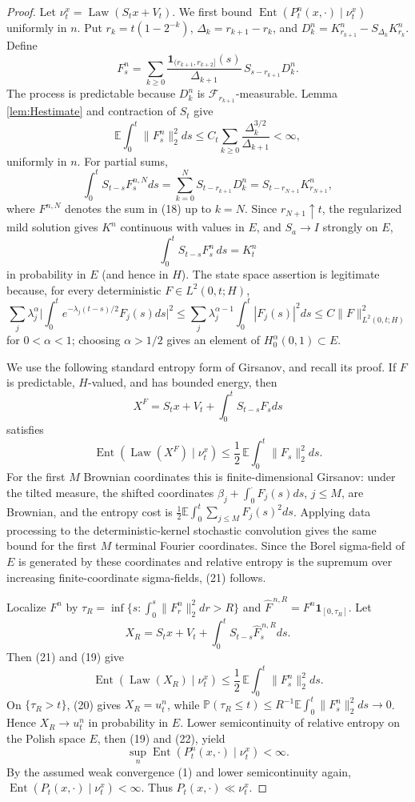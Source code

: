 \documentclass[12pt]{article}
\newcommand{\E}{\mathbb E}
\newcommand{\1}{\mathbf 1}
\newcommand{\Law}{\operatorname{Law}}
\newcommand{\calF}{\mathcal F}
\newcommand{\Ent}{\operatorname{Ent}}
\begin{document}
\begin{proof}
Let \(\nu_t^x=\Law(S_tx+V_t)\).  We first bound
\(\Ent(P_t^n(x,\cdot)\mid\nu_t^x)\) uniformly in \(n\).  Put
\(r_k=t(1-2^{-k})\), \(\Delta_k=r_{k+1}-r_k\), and
\(D_k^n=K^n_{r_{k+1}}-S_{\Delta_k}K^n_{r_k}\).  Define
\[
 F_s^n=\sum_{k\ge0}\frac{\1_{(r_{k+1},r_{k+2}]}(s)}{\Delta_{k+1}}\,
        S_{s-r_{k+1}}D_k^n .                                \tag{18}
\]
The process is predictable because \(D_k^n\) is \(\calF_{r_{k+1}}\)-measurable.
Lemma \ref{lem:Hestimate} and contraction of \(S_t\) give
\[
 \E\int_0^t\|F_s^n\|_2^2ds
 \le C_t\sum_{k\ge0}\frac{\Delta_k^{3/2}}{\Delta_{k+1}}<\infty, \tag{19}
\]
uniformly in \(n\).  For partial sums,
\[
 \int_0^tS_{t-s}F_s^{n,N}ds
 =\sum_{k=0}^NS_{t-r_{k+1}}D_k^n
 =S_{t-r_{N+1}}K^n_{r_{N+1}},
\]
where \(F^{n,N}\) denotes the sum in (18) up to \(k=N\).  Since
\(r_{N+1}\uparrow t\), the regularized mild solution gives \(K^n\) continuous
with values in \(E\), and \(S_a\to I\) strongly on \(E\),
\[
        \int_0^tS_{t-s}F_s^n\,ds=K_t^n                       \tag{20}
\]
in probability in \(E\) (and hence in \(H\)).  The state space assertion is
legitimate because, for every deterministic \(F\in L^2(0,t;H)\),
\[
 \sum_j\lambda_j^\alpha\Big|\int_0^te^{-\lambda_j(t-s)/2}F_j(s)ds\Big|^2
 \le \sum_j\lambda_j^{\alpha-1}\int_0^t|F_j(s)|^2ds
 \le C\|F\|_{L^2(0,t;H)}^2
\]
for \(0<\alpha<1\); choosing \(\alpha>1/2\) gives an element of
\(H^\alpha_0(0,1)\subset E\).

We use the following standard entropy form of Girsanov, and recall its proof.
If \(F\) is predictable, \(H\)-valued, and has bounded energy, then
\[
 X^F=S_tx+V_t+\int_0^tS_{t-s}F_sds
\]
satisfies
\[
        \Ent(\Law(X^F)\mid\nu_t^x)
        \le \frac12\,\E\int_0^t\|F_s\|_2^2ds .               \tag{21}
\]
For the first \(M\) Brownian coordinates this is finite-dimensional
Girsanov: under the tilted measure, the shifted coordinates
\(\beta_j+\int_0^\cdot F_j(s)ds\), \(j\le M\), are Brownian, and the entropy
cost is \(\frac12\E\int_0^t\sum_{j\le M}F_j(s)^2ds\).  Applying data
processing to the deterministic-kernel stochastic convolution gives the same
bound for the first \(M\) terminal Fourier coordinates.  Since the Borel
sigma-field of \(E\) is generated by these coordinates and relative entropy
is the supremum over increasing finite-coordinate sigma-fields, (21) follows.

Localize \(F^n\) by
\(\tau_R=\inf\{s:\int_0^s\|F_r^n\|_2^2dr>R\}\) and
\(\widehat F^{\,n,R}=F^n\1_{[0,\tau_R]}\).  Let
\[
 X_R=S_tx+V_t+\int_0^tS_{t-s}\widehat F^{\,n,R}_sds .
\]
Then (21) and (19) give
\[
 \Ent(\Law(X_R)\mid\nu_t^x)
 \le \frac12\,\E\int_0^t\|F_s^n\|_2^2ds .                   \tag{22}
\]
On \(\{\tau_R>t\}\), (20) gives \(X_R=u_t^n\), while
\(\mathbb P(\tau_R\le t)\le R^{-1}\E\int_0^t\|F_s^n\|_2^2ds\to0\).  Hence
\(X_R\to u_t^n\) in probability in \(E\).  Lower semicontinuity of relative
entropy on the Polish space \(E\), then (19) and (22), yield
\[
        \sup_n\Ent(P_t^n(x,\cdot)\mid\nu_t^x)<\infty .       \tag{23}
\]
By the assumed weak convergence (1) and lower semicontinuity again,
\(\Ent(P_t(x,\cdot)\mid\nu_t^x)<\infty\).  Thus
\(P_t(x,\cdot)\ll\nu_t^x\).


\end{proof}
\end{document}
